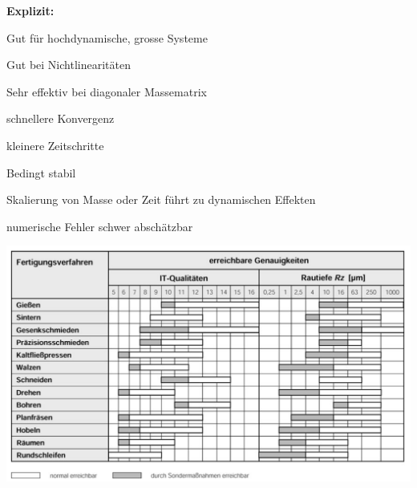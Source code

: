 \textbf{Explizit:} \\
\begin{minipage}{0.45\linewidth}
    \begin{plusitemize}
        \item Gut für hochdynamische, grosse Systeme
        \item Gut bei Nichtlinearitäten
        \item Sehr effektiv bei diagonaler Massematrix 
        \item schnellere Konvergenz
    \end{plusitemize}
\end{minipage}
\begin{minipage}{0.5\linewidth}
    \begin{minusitemize}
        \item kleinere Zeitschritte
        \item Bedingt stabil
        \item Skalierung von Masse oder Zeit führt zu dynamischen Effekten
        \item numerische Fehler schwer abschätzbar
    \end{minusitemize}
\end{minipage}
\begin{center}
    \includegraphics[width=0.9\linewidth]{src/images/Genauigkeiten.png}
\end{center}
